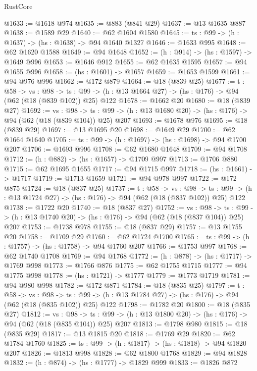 \begin{lexlean}{RustCore}
\begin{coremodule}
@1633 := @1618 @974
@1635 := @883 (@841 @29)
@1637 := @13 @1635 @887
@1638 := @1589 @29
@1640 := @62 @1604 @1580
@1645 := {ts : @99} -> (h : @1637) -> (hs : @1638) -> @94 @1640 @1327
@1646 := @1633 @995
@1648 := @62 @1620 @1588
@1649 := @94 @1648
@1652 := (h : @914) -> (hs : @1597) -> @1649 @996
@1653 := @1646 @912
@1655 := @62 @1635 @1595
@1657 := @94 @1655 @996
@1658 := (hs : @1601) -> @1657
@1659 := @1653 @1599
@1661 := @94 @976 @996
@1662 := @172 @879
@1664 := @18 (@839 @25)
@1677 := {t : @58} ->
  {vs : @98} ->
  {ts : @99} -> (h : @13 @1664 @27) -> (hs : @176) -> @94 (@62 (@18 (@839 @102)) @25) @122
@1678 := @1662 @20
@1680 := @18 (@839 @27)
@1692 := {vs : @98} ->
  {ts : @99} -> (h : @13 @1680 @20) -> (hs : @176) -> @94 (@62 (@18 (@839 @104)) @25) @207
@1693 := @1678 @976
@1695 := @18 (@839 @29)
@1697 := @13 @1695 @20
@1698 := @1649 @29
@1700 := @62 @1664 @1640
@1705 := {ts : @99} -> (h : @1697) -> (hs : @1698) -> @94 @1700 @207
@1706 := @1693 @996
@1708 := @62 @1680 @1648
@1709 := @94 @1708
@1712 := (h : @882) -> (hs : @1657) -> @1709 @997
@1713 := @1706 @880
@1715 := @62 @1695 @1655
@1717 := @94 @1715 @997
@1718 := (hs : @1661) -> @1717
@1719 := @1713 @1659
@1721 := @94 @978 @997
@1722 := @172 @875
@1724 := @18 (@837 @25)
@1737 := {t : @58} ->
  {vs : @98} ->
  {ts : @99} -> (h : @13 @1724 @27) -> (hs : @176) -> @94 (@62 (@18 (@837 @102)) @25) @122
@1738 := @1722 @20
@1740 := @18 (@837 @27)
@1752 := {vs : @98} ->
  {ts : @99} -> (h : @13 @1740 @20) -> (hs : @176) -> @94 (@62 (@18 (@837 @104)) @25) @207
@1753 := @1738 @978
@1755 := @18 (@837 @29)
@1757 := @13 @1755 @20
@1758 := @1709 @29
@1760 := @62 @1724 @1700
@1765 := {ts : @99} -> (h : @1757) -> (hs : @1758) -> @94 @1760 @207
@1766 := @1753 @997
@1768 := @62 @1740 @1708
@1769 := @94 @1768
@1772 := (h : @878) -> (hs : @1717) -> @1769 @998
@1773 := @1766 @876
@1775 := @62 @1755 @1715
@1777 := @94 @1775 @998
@1778 := (hs : @1721) -> @1777
@1779 := @1773 @1719
@1781 := @94 @980 @998
@1782 := @172 @871
@1784 := @18 (@835 @25)
@1797 := {t : @58} ->
  {vs : @98} ->
  {ts : @99} -> (h : @13 @1784 @27) -> (hs : @176) -> @94 (@62 (@18 (@835 @102)) @25) @122
@1798 := @1782 @20
@1800 := @18 (@835 @27)
@1812 := {vs : @98} ->
  {ts : @99} -> (h : @13 @1800 @20) -> (hs : @176) -> @94 (@62 (@18 (@835 @104)) @25) @207
@1813 := @1798 @980
@1815 := @18 (@835 @29)
@1817 := @13 @1815 @20
@1818 := @1769 @29
@1820 := @62 @1784 @1760
@1825 := {ts : @99} -> (h : @1817) -> (hs : @1818) -> @94 @1820 @207
@1826 := @1813 @998
@1828 := @62 @1800 @1768
@1829 := @94 @1828
@1832 := (h : @874) -> (hs : @1777) -> @1829 @999
@1833 := @1826 @872

\end{coremodule}
\end{lexlean}
